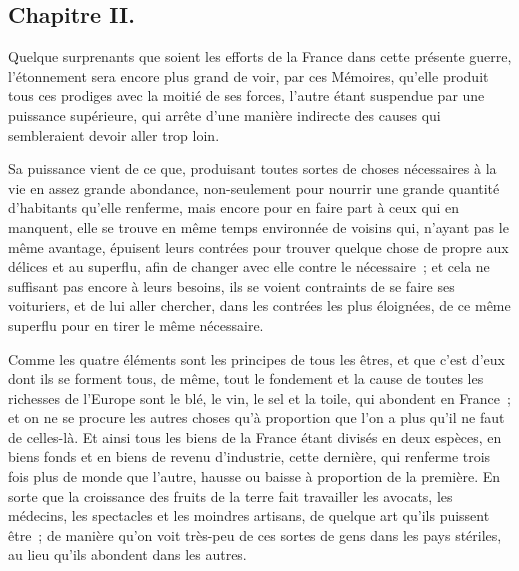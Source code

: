 \documentclass[french,twoside]{book} %
\begin{document}
\subsection[{Chapitre II.}]{Chapitre II.}
\noindent Quelque surprenants que soient les efforts de la France dans cette présente guerre, l’étonnement sera encore plus grand de voir, par ces Mémoires, qu’elle produit tous ces prodiges avec la moitié de ses forces, l’autre étant suspendue par une puissance supérieure, qui arrête d’une manière indirecte des causes qui sembleraient devoir aller trop loin.\par
Sa puissance vient de ce que, produisant toutes sortes de choses nécessaires à la vie en assez grande abondance, non-seulement pour nourrir une grande quantité d’habitants qu’elle renferme, mais encore pour en faire part à ceux qui en manquent, elle se trouve en même temps environnée de voisins qui, n’ayant pas le même avantage, épuisent leurs contrées pour trouver quelque chose de propre aux délices et au superflu, afin de changer avec elle contre le nécessaire ; et cela ne suffisant pas encore à leurs besoins, ils se voient contraints de se faire ses voituriers, et de lui aller chercher, dans les contrées les plus éloignées, de ce même superflu pour en tirer le même nécessaire.\par
Comme les quatre éléments sont les principes de tous les êtres, et que c’est d’eux dont ils se forment tous, de même, tout le fondement et la cause de toutes les richesses de l’Europe sont le blé, le vin, le sel et la toile, qui abondent en France ; et on ne se procure les autres choses qu’à proportion que l’on a plus qu’il ne faut de celles-là. Et ainsi tous les biens de la France étant divisés en deux espèces, en biens fonds et en biens de revenu d’industrie, cette dernière, qui renferme trois fois plus de monde que l’autre, hausse ou baisse à proportion de la première. En sorte que la croissance des fruits de la terre fait travailler les avocats, les médecins, les spectacles et les moindres artisans, de quelque art qu’ils puissent être ; de manière qu’on voit très-peu de ces sortes de gens dans les pays stériles, au lieu qu’ils abondent dans les autres.
\end{document}
